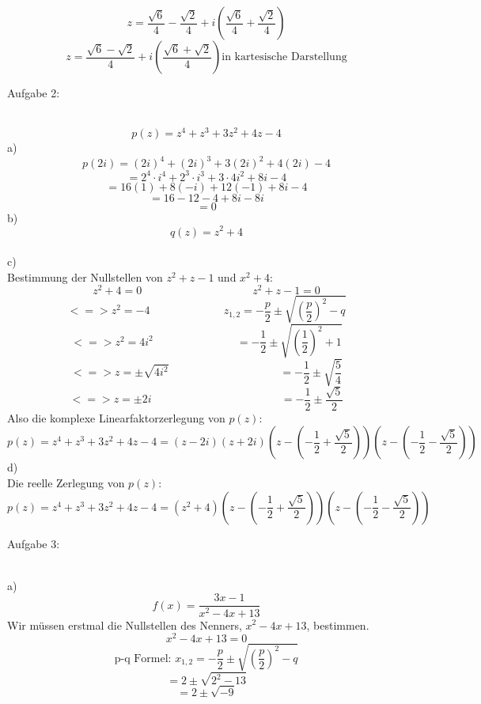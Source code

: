 \documentclass[11pt]{article}
\begin{document}
				$$z=\frac{\sqrt{6}}{4}-\frac{\sqrt{2}}{4}+i\left(\frac{\sqrt{6}}{4}+\frac{\sqrt{2}}{4}\right)$$
				$$z=\frac{\sqrt{6}-\sqrt{2}}{4}+i\left(\frac{\sqrt{6}+\sqrt{2}}{4}\right) \mbox{in kartesische Darstellung}$$
		\noindent \begin{Large}Aufgabe 2:\end{Large}\\[2pt]
				$$p(z)=z^4+z^3+3z^2+4z-4$$
			\indent a)\\
				$$p(2i)=(2i)^4+(2i)^3+3(2i)^2+4(2i)-4$$
				$$=2^4\cdot i^4+2^3\cdot i^3+3\cdot 4i^2+8i-4$$
				$$=16(1) +8(-i)+12(-1)+8i-4$$
				$$=16-12-4+8i-8i$$
				$$=0$$
			\indent b)\\
				$$q(z)=z^2+4$$
				\\
			\indent c)\\
				Bestimmung der Nullstellen von $z^2+z-1$ und $x^2+4$:\\
				$$z^2+4 =0 \hspace{120pt} z^2+z-1=0$$
				$$<=>z^2=-4 \hspace{80pt} z_{1,2}=-\frac{p}{2}\pm \sqrt{\left(\frac{p}{2}\right)^2-q}$$
				$$<=>z^2=4i^2 \hspace{90pt} =-\frac{1}{2}\pm \sqrt{\left(\frac{1}{2}\right)^2+1}$$
				$$<=>z=\pm \sqrt{4i^2} \hspace{120pt} =-\frac{1}{2}\pm \sqrt{\frac{5}{4}}$$
				$$<=>z=\pm 2i \hspace{140pt} =-\frac{1}{2} \pm \frac{\sqrt{5}}{2}$$
				Also die komplexe Linearfaktorzerlegung von $p(z)$:\\
				$$p(z)=z^4+z^3+3z^2+4z-4=(z-2i)(z+2i)(z-\left(-\frac{1}{2}+\frac{\sqrt{5}}{2}\right))(z-\left(-\frac{1}{2}-\frac{\sqrt{5}}{2}\right))$$
			\indent d)\\
				Die reelle Zerlegung von $p(z)$:\\
				$$p(z)=z^4+z^3+3z^2+4z-4=(z^2+4)(z-\left(-\frac{1}{2}+\frac{\sqrt{5}}{2}\right))(z-\left(-\frac{1}{2}-\frac{\sqrt{5}}{2}\right))$$
		\noindent \begin{Large}Aufgabe 3:\end{Large}\\[2pt]
			\indent a)\\
				$$f(x)=\frac{3x-1}{x^2-4x+13}$$
				Wir müssen erstmal die Nullstellen des Nenners, $x^2-4x+13$, bestimmen.\\
				$$x^2-4x+13=0$$
				$$\mbox{p-q Formel: } x_{1,2}=-\frac{p}{2}\pm \sqrt{\left(\frac{p}{2}\right)^2-q}$$
				$$=2\pm \sqrt{2^2-13}$$
				$$=2\pm \sqrt{-9}$$
\end{document}
